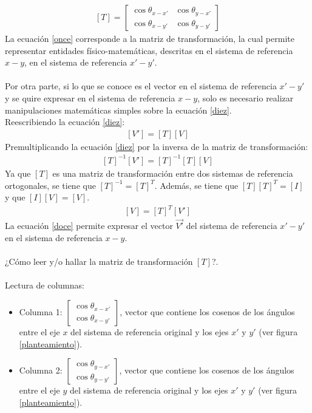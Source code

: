 \documentclass[12pt,letterpaper, twoside, openany]{article}
\begin{document}
%
\begin{align}
	\left[ T \right] = \left[ \begin{array}{cc}
		\cos \theta_{x-x'} & \cos \theta_{y-x'} \\
		\cos \theta_{x-y'} & \cos \theta_{y-y'}	
	\end{array} \right] \label{once}
\end{align}
%
La  ecuación \ref{once} corresponde a la matriz de transformación, la cual permite representar entidades físico-matemáticas, descritas en el sistema de referencia $x-y$, en el sistema de referencia $x'-y'$.\\\\

Por otra parte, si lo que se conoce es el vector en el sistema de referencia $x'-y'$ y se quire  expresar en el sistema de referencia $x-y$, solo es necesario realizar manipulaciones matemáticas simples sobre la ecuación \ref{diez}.\\
%
Reescribiendo la ecuación \ref{diez}:
%
\begin{align*}
	\left[ V' \right] = \left[ T \right] \left[ V \right]
\end{align*}
%
Premultiplicando la ecuación \ref{diez} por la inversa de la matriz de transformación:
%
\begin{align*}
	\left[ T \right]^{-1} \left[ V' \right] = \left[ T \right]^{-1} \left[ T \right] \left[ V \right]
\end{align*}
%
Ya que $\left[ T \right]$ es una matriz de transformación entre dos sistemas de referencia ortogonales, se tiene que $\left[ T \right]^{-1} = \left[ T \right]^T$. Además, se tiene que $\left[ T \right] \left[ T \right]^T = \left[ I \right]$ y que $\left[ I \right] \left[ V \right] = \left[ V \right]$.
%
\begin{align}
	\left[ V \right] = \left[ T \right]^T \left[ V' \right] \label{doce}
\end{align}
%
La ecuación \ref{doce} permite expresar el vector $\overset{\rightarrow}{V'}$ del sistema de referencia $x'-y'$ en el sistema de referencia $x-y$.\\\\
%
¿Cómo leer y/o hallar la matriz de transformación $\left[ T \right]$?.\\\\
Lectura de columnas:
%
\begin{itemize}
	\item Columna 1: $ \left[ \begin{array}{c}
		\cos \theta_{x-x'} \\	 \cos \theta_{x-y'}
	\end{array} \right]$, vector que contiene los cosenos de los ángulos entre el eje $x$ del sistema de referencia original y los ejes $x'$ y $y'$ (ver figura \ref{planteamiento}).
	\item Columna 2: $ \left[ \begin{array}{c}
		\cos \theta_{y-x'} \\	 \cos \theta_{y-y'}
	\end{array} \right]$, vector que contiene los cosenos de los ángulos entre el eje $y$ del sistema de referencia original y los ejes $x'$ y $y'$ (ver figura \ref{planteamiento}).
\end{itemize}
\end{document}
